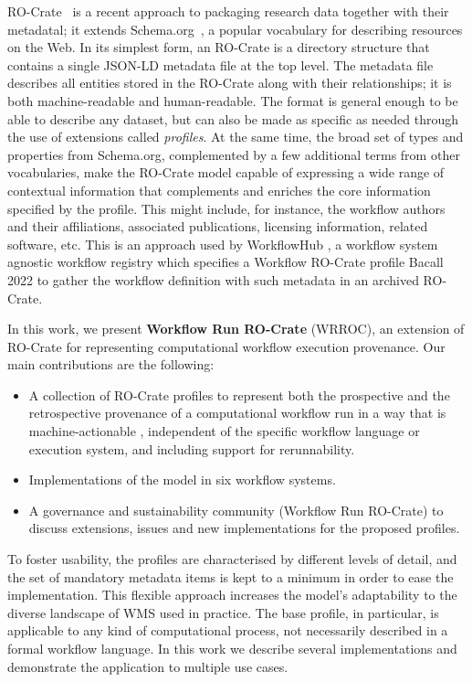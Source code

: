\documentclass[10pt,letterpaper]{article}
\begin{document}
RO-Crate~\cite{Soiland-Reyes 2022a} is a recent approach to packaging research data together with their metadatal; it extends Schema.org~\cite{Guha 2015}, a popular vocabulary for describing resources on the Web.
In its simplest form, an RO-Crate is a directory structure that contains a single JSON-LD metadata file at the top level.
The metadata file describes all entities stored in the RO-Crate along with their relationships; it is both machine-readable and human-readable.
The format is general enough to be able to describe any dataset, but can also be made as specific as needed through the use of extensions called
\emph{profiles}.
At the same time, the broad set of types and properties from Schema.org, complemented by a few additional terms from other vocabularies, make the RO-Crate model capable of expressing a wide range of contextual information that complements and enriches the core information specified by the profile.
This might include, for instance, the workflow authors and their affiliations, associated publications, licensing information, related software, etc.
This is an approach used by WorkflowHub \cite{Goble 2021}, a workflow system agnostic workflow registry which specifies a Workflow RO-Crate profile {Bacall 2022} to gather the workflow definition with such metadata in an archived RO-Crate. 

In this work, we present \textbf{Workflow Run RO-Crate} (WRROC), an extension of RO-Crate for representing computational workflow execution provenance.
Our main contributions are the following:

\begin{itemize}
\item   A collection of RO-Crate profiles to represent both the prospective and the retrospective provenance of a computational   workflow run in a way that is machine-actionable \cite{Batista 2022},  independent of the specific  workflow language or   execution system, and including support for rerunnability.
\item   Implementations of the model in six workflow systems.
\item   A governance and sustainability community (Workflow Run RO-Crate) to discuss extensions,  issues and new implementations for the proposed   profiles.
\end{itemize}

To foster usability, the profiles are characterised by different levels of detail, and the set of mandatory metadata items is kept to a minimum in order to ease the implementation.
This flexible approach increases the model's adaptability to the diverse landscape of WMS used in practice.
The base profile, in particular, is applicable to any kind of computational process, not necessarily described in a formal workflow language.
In this work we describe several implementations and demonstrate the application to multiple use cases.
\end{document}
